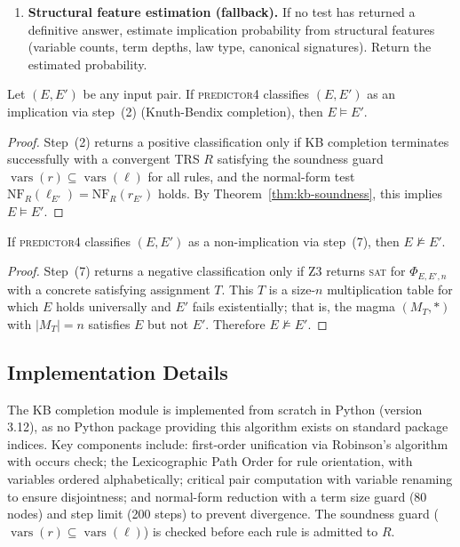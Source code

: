 \begin{enumerate}[(1)]
  \item \textbf{Structural feature estimation (fallback).}
        If no test has returned a definitive answer, estimate implication probability
        from structural features (variable counts, term depths, law type, canonical
        signatures).  Return the estimated probability.
\end{enumerate}

\begin{theorem}\label{thm:no-fp}
Let $(E, E')$ be any input pair.  If \textsc{predictor4} classifies $(E, E')$ as an
implication via step~(2) (Knuth-Bendix completion), then $E \models E'$.
\end{theorem}

\begin{proof}
Step~(2) returns a positive classification only if KB completion terminates
successfully with a convergent TRS $R$ satisfying the soundness guard
$\operatorname{vars}(r) \subseteq \operatorname{vars}(\ell)$ for all rules, and the normal-form test
$\mathrm{NF}_R(\ell_{E'}) = \mathrm{NF}_R(r_{E'})$ holds.  By
Theorem~\ref{thm:kb-soundness}, this implies $E \models E'$.
\end{proof}

\begin{theorem}\label{thm:z3-no-fp}
If \textsc{predictor4} classifies $(E, E')$ as a non-implication via step~(7),
then $E \not\models E'$.
\end{theorem}

\begin{proof}
Step~(7) returns a negative classification only if Z3 returns \textsc{sat} for
$\Phi_{E,E',n}$ with a concrete satisfying assignment $T$.  This $T$ is a size-$n$
multiplication table for which $E$ holds universally and $E'$ fails existentially;
that is, the magma $(M_T, *)$ with $|M_T| = n$ satisfies $E$ but not $E'$.
Therefore $E \not\models E'$.
\end{proof}

\subsection{Implementation Details}

The KB completion module is implemented from scratch in Python (version 3.12),
as no Python package providing this algorithm exists on standard package indices.
Key components include: first-order unification via Robinson's algorithm
\cite{robinson1965machine} with occurs check; the Lexicographic Path Order for
rule orientation, with variables ordered alphabetically; critical pair computation
with variable renaming to ensure disjointness; and normal-form reduction with a
term size guard (80 nodes) and step limit (200 steps) to prevent divergence.
The soundness guard ($\operatorname{vars}(r) \subseteq \operatorname{vars}(\ell)$) is checked before each
rule is admitted to $R$.

